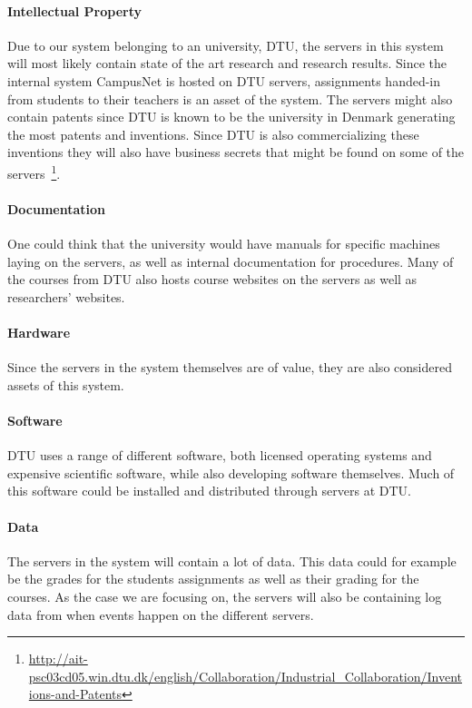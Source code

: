 \paragraph{Intellectual Property}
Due to our system belonging to an university, DTU, the servers in this system will most likely contain state of the art research and research results. Since the internal system CampusNet is hosted on DTU servers, assignments handed-in from students to their teachers is an asset of the system. The servers might also contain patents since DTU is known to be the university in Denmark generating the most patents and inventions. Since DTU is also commercializing these inventions they will also have business secrets that might be found on some of the servers~\footnote{\raggedright \url{ http://ait-psc03cd05.win.dtu.dk/english/Collaboration/Industrial_Collaboration/Inventions-and-Patents}}.

\paragraph{Documentation}
One could think that the university would have manuals for specific machines laying on the servers, as well as internal documentation for procedures. Many of the courses from DTU also hosts course websites on the servers as well as researchers' websites.

\paragraph{Hardware}
Since the servers in the system themselves are of value, they are also considered assets of this system.

\paragraph{Software}
DTU uses a range of different software, both licensed operating systems and expensive scientific software, while also developing software themselves. Much of this software could be installed and distributed through servers at DTU.

\paragraph{Data}
The servers in the system will contain a lot of data. This data could for example be the grades for the students assignments as well as their grading for the courses. As the case we are focusing on, the servers will also be containing log data from when events happen on the different servers.


